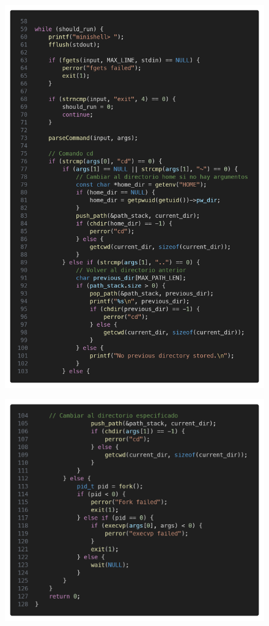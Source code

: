 \documentclass{templateNote}
\begin{document}
\begin{figure}[H]
    \centering
    \includegraphics[width=\textwidth]{img/code2.png}
\end{figure}
\begin{figure}[H]
    \centering
    \includegraphics[width=\textwidth]{img/code3.png}
\end{figure}
\end{document}
